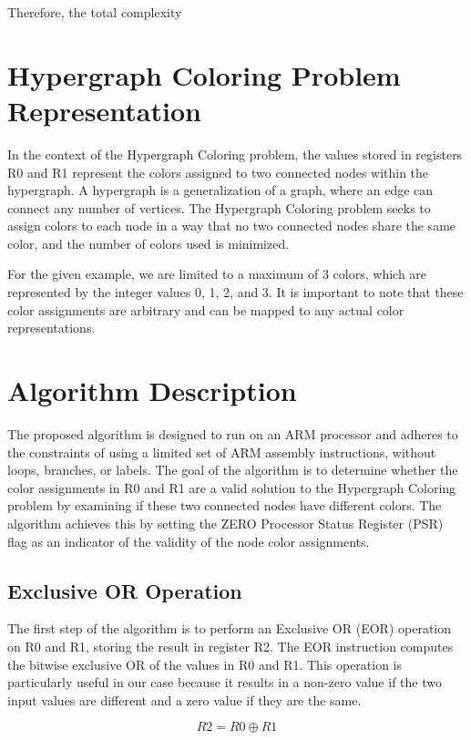 Therefore, the total complexity

\section{Hypergraph Coloring Problem Representation}
In the context of the Hypergraph Coloring problem, the values stored in registers R0 and R1 represent the colors assigned to two connected nodes within the hypergraph. A hypergraph is a generalization of a graph, where an edge can connect any number of vertices. The Hypergraph Coloring problem seeks to assign colors to each node in a way that no two connected nodes share the same color, and the number of colors used is minimized.

For the given example, we are limited to a maximum of 3 colors, which are represented by the integer values 0, 1, 2, and 3. It is important to note that these color assignments are arbitrary and can be mapped to any actual color representations.

\section{Algorithm Description}
The proposed algorithm is designed to run on an ARM processor and adheres to the constraints of using a limited set of ARM assembly instructions, without loops, branches, or labels. The goal of the algorithm is to determine whether the color assignments in R0 and R1 are a valid solution to the Hypergraph Coloring problem by examining if these two connected nodes have different colors. The algorithm achieves this by setting the ZERO Processor Status Register (PSR) flag as an indicator of the validity of the node color assignments.

\subsection{Exclusive OR Operation}
The first step of the algorithm is to perform an Exclusive OR (EOR) operation on R0 and R1, storing the result in register R2. The EOR instruction computes the bitwise exclusive OR of the values in R0 and R1. This operation is particularly useful in our case because it results in a non-zero value if the two input values are different and a zero value if they are the same.

\begin{equation}
R2 = R0 \oplus R1
\end{equation}

